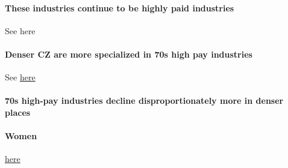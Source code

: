 \paragraph{These industries continue to be highly paid industries}
See here






\paragraph{Denser CZ are more specialized in 70s high pay industries}


See \href{https://www.dropbox.com/s/dwse5a96c5xl2xx/high_pay_ind_density_full_time.png?dl=0}{here}

\paragraph{70s high-pay industries decline disproportionately more in denser places}


\paragraph{Women }
\href{https://www.dropbox.com/s/dwse5a96c5xl2xx/high_pay_ind_density_full_time.png?dl=0}{here}



